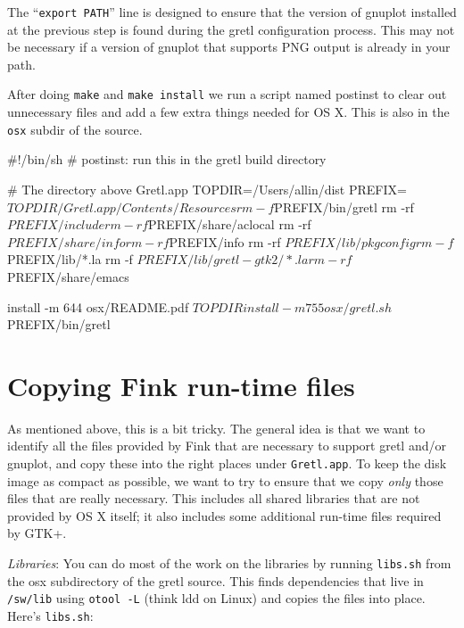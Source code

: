 \documentclass{article}
\begin{document}
The ``\texttt{export PATH}'' line is designed to ensure that the
version of gnuplot installed at the previous step is found during the
gretl configuration process.  This may not be necessary if a version
of gnuplot that supports PNG output is already in your path.

After doing \texttt{make} and \texttt{make install} we run a script
named postinst to clear out unnecessary files and add a few extra
things needed for OS X.  This is also in the \texttt{osx} subdir of
the source.

\begin{code}
#!/bin/sh
# postinst: run this in the gretl build directory

# The directory above Gretl.app
TOPDIR=/Users/allin/dist
PREFIX=$TOPDIR/Gretl.app/Contents/Resources

rm -f $PREFIX/bin/gretl
rm -rf $PREFIX/include
rm -rf $PREFIX/share/aclocal
rm -rf $PREFIX/share/info
rm -rf $PREFIX/info
rm -rf $PREFIX/lib/pkgconfig
rm -f $PREFIX/lib/*.la
rm -f $PREFIX/lib/gretl-gtk2/*.la
rm -rf $PREFIX/share/emacs

install -m 644 osx/README.pdf $TOPDIR
install -m 755 osx/gretl.sh $PREFIX/bin/gretl
\end{code}

\section{Copying Fink run-time files}

As mentioned above, this is a bit tricky.  The general idea is that we
want to identify all the files provided by Fink that are necessary to
support gretl and/or gnuplot, and copy these into the right places
under \texttt{Gretl.app}.  To keep the disk image as compact as
possible, we want to try to ensure that we copy \textit{only} those
files that are really necessary.  This includes all shared libraries
that are not provided by OS X itself; it also includes some additional
run-time files required by GTK+.

\textit{Libraries}: You can do most of the work on the libraries by
running \texttt{libs.sh} from the osx subdirectory of the gretl
source.  This finds dependencies that live in \texttt{/sw/lib} using
\texttt{otool -L} (think ldd on Linux) and copies the files
into place. Here's \texttt{libs.sh}:

\end{document}

